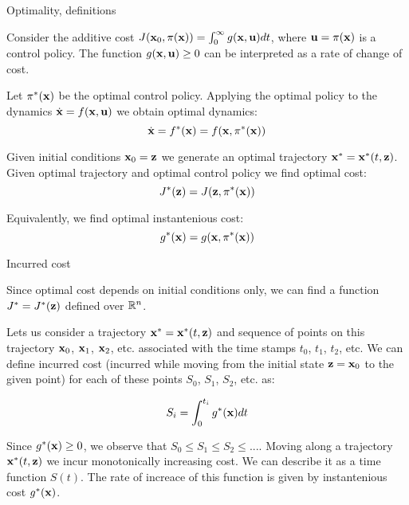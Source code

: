 \documentclass{beamer}
\begin{document}
\begin{frame}{Optimality, definitions}
	\begin{flushleft}
		
		Consider the additive cost $J (\mathbf{x}_0, \pi (\mathbf{x})) = \int_0^\infty g(\mathbf{x}, \mathbf{u}) dt$, where $\mathbf{u} = \pi (\mathbf{x})$ is a control policy. The function $g(\mathbf{x}, \mathbf{u}) \geq 0$ can be interpreted as a rate of change of cost.
		
		\bigskip
		
		Let $\pi^*(\mathbf{x})$ be the optimal control policy. Applying the optimal policy to the dynamics $\dot{\mathbf{x}} = f(\mathbf{x}, \mathbf{u})$ we obtain optimal dynamics:
		\begin{equation}
			\dot{\mathbf{x}} = f^*(\mathbf{x}) = f(\mathbf{x}, \pi^*(\mathbf{x}))
		\end{equation}
		
		Given initial conditions $\mathbf{x}_0 = \mathbf{z}$ we generate an optimal trajectory $\mathbf{x}^* = \mathbf{x}^*(t, \mathbf{z})$. Given optimal trajectory and optimal control policy we find optimal cost:
		\begin{equation}
			J^*(\mathbf{z}) = J(\mathbf{z}, \pi^* (\mathbf{x}))
		\end{equation}
		
		Equivalently, we find optimal instantenious cost:
		\begin{equation}
			g^*(\mathbf{x}) = g(\mathbf{x}, \pi^* (\mathbf{x}))
		\end{equation}
		
		
	\end{flushleft}
\end{frame}



\begin{frame}{Incurred cost}
	\begin{flushleft}
		
		Since optimal cost depends on initial conditions only, we can find a function $J^* = J^*(\mathbf{z})$ defined over $\mathbb{R}^n$.
		
		\bigskip
		
		Lets us consider a trajectory $\mathbf{x}^* = \mathbf{x}^*(t, \mathbf{z})$ and sequence of points on this trajectory $\mathbf{x}_0$, $\mathbf{x}_1$, $\mathbf{x}_2$, etc. associated with the time stamps $t_0$, $t_1$, $t_2$, etc. We can define incurred cost (incurred while moving from the initial state $\mathbf{z} = \mathbf{x}_0$ to the given point) for each of these points $S_0$, $S_1$, $S_2$, etc. as:
		
		\begin{equation}
			S_i = \int_0^{t_i} g^*(\mathbf{x}) dt
		\end{equation}
		
		Since $g^*(\mathbf{x}) \geq 0$, we observe that $S_0 \leq S_1 \leq S_2 \leq ...$. Moving along a trajectory $\mathbf{x}^*(t, \mathbf{z})$ we incur monotonically increasing cost. We can describe it as a time function $S(t)$. The rate of increace of this function is given by instantenious cost $g^*(\mathbf{x})$.
		
		
	\end{flushleft}
\end{frame}
\end{document}
